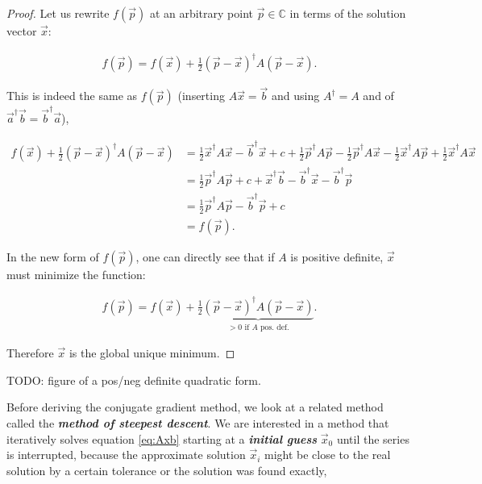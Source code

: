 \documentclass{article}
\theoremstyle{plain} %
\theoremstyle{remark} %
\def\df#1{\textbf{\textit{#1}}}
\numberwithin{equation}{section}
\begin{document}

\begin{proof}
Let us rewrite $f(\vec{p})$ at an arbitrary point $\vec{p} \in \mathbb{C}$ in terms of the solution vector $\vec{x}$:

\begin{align*}
    f(\vec{p}) = f(\vec{x}) + \frac{1}{2} (\vec{p} - \vec{x})^{\dagger} A (\vec{p} - \vec{x}).
\end{align*}

This is indeed the same as $f(\vec{p})$ (inserting $A \vec{x} = \vec{b}$ and using $A^{\dagger}=A$ and of $\vec{a}^{\dagger} \vec{b} = \vec{b}^{\dagger} \vec{a}$),

\begin{align*}
f(\vec{x}) + \frac{1}{2} (\vec{p} - \vec{x})^{\dagger} A (\vec{p} - \vec{x}) &= \frac{1}{2} \vec{x}^{\dagger} A \vec{x} - \vec{b}^{\dagger} \vec{x} + c + \frac{1}{2} \vec{p}^{\dagger} A \vec{p} - \frac{1}{2} \vec{p}^{\dagger} A \vec{x} - \frac{1}{2} \vec{x}^{\dagger} A \vec{p} + \frac{1}{2} \vec{x}^{\dagger} A \vec{x} \\
&= \frac{1}{2} \vec{p}^{\dagger} A \vec{p} + c + \vec{x}^{\dagger} \vec{b} - \vec{b}^{\dagger} \vec{x} - \vec{b}^{\dagger} \vec{p} \\
&= \frac{1}{2} \vec{p}^{\dagger} A \vec{p} - \vec{b}^{\dagger} \vec{p} + c \\
&= f(\vec{p}).
\end{align*}

In the new form of $f(\vec{p})$, one can directly see that if $A$ is positive definite, $\vec{x}$ must minimize the function:

\begin{align*}
    f(\vec{p}) = f(\vec{x}) + \frac{1}{2} \underbrace{ (\vec{p} - \vec{x})^{\dagger} A (\vec{p} - \vec{x}) }_{\text{$> 0$ if $A$ pos. def.}}.
\end{align*}

Therefore $\vec{x}$ is the global unique minimum.

\end{proof}

TODO: figure of a pos/neg definite quadratic form.

Before deriving the conjugate gradient method, we look at a related method called the \df{method of steepest descent}. We are interested in a method that iteratively solves equation \eqref{eq:Axb} starting at a \df{initial guess} $\vec{x}_0$ until the series is interrupted, because the approximate solution $\vec{x}_i$ might be close to the real solution by a certain tolerance or the solution was found exactly,
\end{document}
